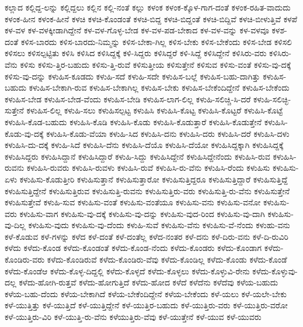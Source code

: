 {ಕಲ್ಲಾದ
ಕಲ್ಲಿದ್ದ-ಲನ್ನು
ಕಲ್ಲಿದ್ದಲು
ಕಲ್ಲಿನ
ಕಲ್ಲಿ-ನಂತೆ
ಕಲ್ಲು
ಕಳಂಕ
ಕಳಂಕ-ಕ್ಕೊಳ-ಗಾಗ-ದಂತೆ
ಕಳಂಕ-ರಹಿತ-ವಾದುದು
ಕಳಂಕ-ಹೀನ
ಕಳಂಕ-ಹೀನೆ
ಕಳಚಿ
ಕಳಚಿ-ಕೊಂಡಂತೆ
ಕಳಚಿ-ಬಿದ್ದ
ಕಳಚಿ-ಬಿದ್ದಂತೆ
ಕಳಚಿ-ಬಿದ್ದಿವೆ
ಕಳಚಿ-ಬೀಳುತ್ತಿವೆ
ಕಳಪೆ
ಕಳ-ವಳ
ಕಳ-ವಳಕ್ಕೀಡಾಗಿದ್ದೇನೆ
ಕಳ-ವಳ-ಗೊಳ್ಳ-ಬೇಡ
ಕಳ-ವಳ-ಪಡ-ಬೇಕಾದ
ಕಳ-ವಳ-ವನ್ನು
ಕಳ-ವಳವೂ
ಕಳಶ-ದಂತೆ
ಕಳಿಸ-ಬಾರದು
ಕಳಿಸ-ಬಾರದು-ನಿಮ್ಮನ್ನು
ಕಳಿಸ-ಬೇಕಾ-ಗಿಲ್ಲ
ಕಳಿಸ-ಬೇಕು
ಕಳಿಸ-ಬೇಕೆಂದು
ಕಳಿಸ-ಬೇಡ
ಕಳಿಸಲಿ
ಕಳಿಸಲು
ಕಳಿಸಲ್ಪಟ್ಟಿತು
ಕಳಿಸಿ
ಕಳಿಸಿದ
ಕಳಿಸಿದ್ದಕ್ಕೆ
ಕಳಿ-ಸಿದ್ದರು
ಕಳಿಸಿದ್ದರೆ
ಕಳಿ-ಸಿದ್ದೆ
ಕಳಿಸಿದ್ದೇನೆ
ಕಳಿಸಿರು-ವರು
ಕಳಿಸಿರು-ವೆನು
ಕಳಿಸು
ಕಳಿಸು-ತ್ತಿರ-ಬಹುದು
ಕಳಿಸು-ತ್ತಿ-ರುವೆ
ಕಳಿಸುತ್ತೀಯ
ಕಳಿಸುತ್ತೇನೆ
ಕಳಿಸುವ
ಕಳಿಸು-ವಂತೆ
ಕಳಿಸು-ವು-ದಕ್ಕೆ
ಕಳಿಸು-ವು-ದನ್ನು
ಕಳುಹಿಸ-ಕೂಡದು
ಕಳುಹಿ-ಸದೆ
ಕಳುಹಿ-ಸದೇ
ಕಳುಹಿಸ-ಬಲ್ಲೆ
ಕಳುಹಿಸ-ಬಹು-ದಾಗಿತ್ತು
ಕಳುಹಿಸ-ಬಹುದು
ಕಳುಹಿಸ-ಬೇಕಾಗಿ-ರುವ
ಕಳುಹಿಸ-ಬೇಕಾಗಿಲ್ಲ
ಕಳುಹಿಸ-ಬೇಕು
ಕಳುಹಿಸ-ಬೇಕೆಂದಿದ್ದೇನೆ
ಕಳುಹಿಸ-ಬೇಕೆಂದು
ಕಳುಹಿಸ-ಬೇಡ
ಕಳುಹಿಸ-ಬೇಡ-ವೆಂದು
ಕಳುಹಿಸ-ಬೇಡಿ
ಕಳುಹಿಸ-ಲಾಗ-ಲಿಲ್ಲ
ಕಳುಹಿ-ಸಲಿಚ್ಚಿ-ಸಿ-ದರೆ
ಕಳುಹಿ-ಸಲಿಚ್ಛಿ-ಸುತ್ತೇನೆ
ಕಳುಹಿಸ-ಲಿಲ್ಲ
ಕಳುಹಿ-ಸಲು
ಕಳುಹಿಸಲ್ಪಟ್ಟ
ಕಳುಹಿಸಿ
ಕಳುಹಿಸಿ-ಕೊಟ್ಟ
ಕಳುಹಿಸಿ-ಕೊಟ್ಟರೆ
ಕಳುಹಿಸಿ-ಕೊಟ್ಟೆ
ಕಳುಹಿಸಿ-ಕೊಡ-ಬಹುದು
ಕಳುಹಿಸಿ-ಕೊಡಿ
ಕಳುಹಿಸಿ-ಕೊಡು
ಕಳುಹಿಸಿ-ಕೊಡುತ್ತಾರೆ
ಕಳುಹಿಸಿ-ಕೊಡುತ್ತೇನೆ
ಕಳುಹಿಸಿ-ಕೊಡು-ವು-ದಕ್ಕೆ
ಕಳುಹಿಸಿ-ಕೊಡು-ವೆಯಾ
ಕಳುಹಿ-ಸಿದ
ಕಳುಹಿಸಿ-ದನು
ಕಳುಹಿಸಿ-ದರು
ಕಳುಹಿಸಿ-ದರೆ
ಕಳುಹಿಸಿ-ದಳು
ಕಳುಹಿಸಿ-ದು-ದಕ್ಕೆ
ಕಳುಹಿ-ಸಿದೆ
ಕಳುಹಿಸಿ-ದೆನು
ಕಳುಹಿಸಿ-ದೆಯೊ
ಕಳುಹಿಸಿ-ದೆಯೋ
ಕಳುಹಿಸಿದ್ದಕ್ಕಾಗಿ
ಕಳುಹಿಸಿದ್ದಕ್ಕೆ
ಕಳುಹಿಸಿದ್ದರು
ಕಳುಹಿಸಿದ್ದಾನೆ
ಕಳುಹಿಸಿದ್ದಾರೆ
ಕಳುಹಿ-ಸಿದ್ದು
ಕಳುಹಿಸಿದ್ದೇನೆ
ಕಳುಹಿಸಿದ್ದೇನೆಂದು
ಕಳುಹಿಸಿ-ರುವ
ಕಳುಹಿಸಿ-ರುವನು
ಕಳುಹಿಸಿ-ರುವರು
ಕಳುಹಿಸಿ-ರುವಳು
ಕಳುಹಿಸಿ-ರುವೆ
ಕಳುಹಿಸಿ-ರು-ವೆನು
ಕಳುಹಿಸಿ-ರೆಂದು
ಕಳುಹಿಸು
ಕಳುಹಿಸು-ಏಳು
ಕಳುಹಿಸು-ಕೊಡುತ್ತೀರಿ
ಕಳುಹಿಸುತ್ತಾನೆ
ಕಳುಹಿಸುತ್ತಾರೋ
ಕಳುಹಿಸುತ್ತಿದ್ದರೂ
ಕಳುಹಿಸುತ್ತಿದ್ದಾರೆ
ಕಳುಹಿಸುತ್ತಿದ್ದೆ
ಕಳುಹಿಸುತ್ತಿದ್ದೇನೆ
ಕಳುಹಿಸುತ್ತಿರುವ
ಕಳುಹಿಸುತ್ತಿ-ರುವನು
ಕಳುಹಿಸುತ್ತಿರು-ವರು
ಕಳುಹಿಸುತ್ತಿ-ರು-ವೆನು
ಕಳುಹಿಸುತ್ತೇನೆ
ಕಳುಹಿಸುತ್ತೇವೆ
ಕಳುಹಿ-ಸುವ
ಕಳುಹಿಸು-ವಂತೆ
ಕಳುಹಿಸು-ವಂತೆಯೂ
ಕಳುಹಿಸು-ವನು
ಕಳುಹಿಸು-ವನೋ
ಕಳುಹಿಸು-ವರು
ಕಳುಹಿಸು-ವಾಗ
ಕಳುಹಿಸು-ವು-ದಕ್ಕೆ
ಕಳುಹಿಸು-ವು-ದನ್ನು
ಕಳುಹಿಸು-ವುದ-ರಿಂದ
ಕಳುಹಿಸು-ವು-ದಾಗಿ
ಕಳುಹಿಸು-ವು-ದಿಲ್ಲ
ಕಳುಹಿಸು-ವುದು
ಕಳುಹಿಸು-ವು-ದೆಂದು
ಕಳುಹಿ-ಸುವೆ
ಕಳುಹಿಸು-ವೆನು
ಕಳುಹಿಸು-ವೆ-ನೆಂದು
ಕಳುಹು-ವನು
ಕಳೆ-ಕೊಡುವ
ಕಳೆ-ಗಳನ್ನು
ಕಳೆದ
ಕಳೆ-ದಂತೆ
ಕಳೆ-ದಂತೆಲ್ಲ
ಕಳೆದ-ನಂತರ
ಕಳೆ-ದನು
ಕಳೆ-ದಿರು-ವನು
ಕಳೆ-ದಿ-ರುವಿರಿ
ಕಳೆದು
ಕಳೆದು-ಕೊಂಡ
ಕಳೆದು-ಕೊಂಡಂತೆ
ಕಳೆದು-ಕೊಂಡ-ನೆಂದು
ಕಳೆದು-ಕೊಂಡರು
ಕಳೆದು-ಕೊಂಡಾಗ
ಕಳೆದು-ಕೊಂಡಿರು-ವರು
ಕಳೆದು-ಕೊಂಡಿರುವೆ
ಕಳೆದು-ಕೊಂಡಿರು-ವೆವು
ಕಳೆದು-ಕೊಂಡಿಲ್ಲ
ಕಳೆದು-ಕೊಂಡು
ಕಳೆದು-ಕೊಂಡೆ
ಕಳೆದು-ಕೊಂಡೆಆ
ಕಳೆದು-ಕೊಳ್ಳ-ದಿದ್ದಲ್ಲಿ
ಕಳೆದು-ಕೊಳ್ಳದೆ
ಕಳೆದು-ಕೊಳ್ಳಲು
ಕಳೆದು-ಕೊಳ್ಳುವಿ-ರೇನು
ಕಳೆದು-ಕೊಳ್ಳುವು-ದಲ್ಲ
ಕಳೆದು-ಹೋಗಿ-ರುತ್ತವೆ
ಕಳೆದು-ಹೋಗುತ್ತಿದೆ
ಕಳೆದು-ಹೋದ
ಕಳೆದೆ
ಕಳೆದೆನು
ಕಳೆದೆವು
ಕಳೆಯ-ಬಹುದು
ಕಳೆಯ-ಬಹು-ದೆಂದು
ಕಳೆಯ-ಬೇಕಾಗಿದೆ
ಕಳೆಯ-ಬೇಕೆಂದಿದ್ದೇನೆ
ಕಳೆಯ-ಬೇಕೆಂದು
ಕಳೆ-ಯಲು
ಕಳೆ-ಯಲೇ-ಬೇಕು
ಕಳೆ-ಯುತ್ತಿತ್ತು
ಕಳೆ-ಯುತ್ತಿದೆ
ಕಳೆ-ಯುತ್ತಿದ್ದೇನೆ
ಕಳೆ-ಯುತ್ತಿರ-ಬಹುದು
ಕಳೆ-ಯುತ್ತಿರು-ವರು
ಕಳೆ-ಯುತ್ತಿರು-ವರೋ
ಕಳೆ-ಯುತ್ತಿರು-ವಿರಿ
ಕಳೆ-ಯುತ್ತಿ-ರು-ವೆನು
ಕಳೆಯುತ್ತಿರು-ವೆವು
ಕಳೆ-ಯುತ್ತೇನೆ
ಕಳೆ-ಯುವ
ಕಳೆ-ಯುವರು
}
